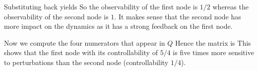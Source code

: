 Substituting back yields 
So the observability of the first node is $1/2$ whereas the observability of the second node is $1$.  It makes sense that the second node has more impact on the dynamics as it has a strong feedback on the first node. 

Now we compute the four numerators that appear in $Q$
Hence the matrix is 
This shows that the first node with its controllability of $5/4$ is five times more sensitive to perturbations than the second node (controllability $1/4$). 
